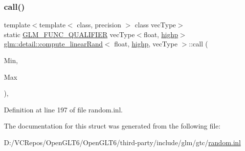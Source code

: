 \subsubsection{\texorpdfstring{call()}{call()}}
{\footnotesize\ttfamily template$<$template$<$ class, precision $>$ class vec\+Type$>$ \\
static \mbox{\hyperlink{setup_8hpp_a33fdea6f91c5f834105f7415e2a64407}{G\+L\+M\+\_\+\+F\+U\+N\+C\+\_\+\+Q\+U\+A\+L\+I\+F\+I\+ER}} vec\+Type$<$float, \mbox{\hyperlink{namespaceglm_a0f04f086094c747d227af4425893f545ac6f7eab42eacbb10d59a58e95e362074}{highp}}$>$ \mbox{\hyperlink{structglm_1_1detail_1_1compute__linear_rand}{glm\+::detail\+::compute\+\_\+linear\+Rand}}$<$ float, \mbox{\hyperlink{namespaceglm_a0f04f086094c747d227af4425893f545ac6f7eab42eacbb10d59a58e95e362074}{highp}}, vec\+Type $>$\+::call (\begin{DoxyParamCaption}\item[{vec\+Type$<$ float, \mbox{\hyperlink{namespaceglm_a0f04f086094c747d227af4425893f545ac6f7eab42eacbb10d59a58e95e362074}{highp}} $>$ const \&}]{Min,  }\item[{vec\+Type$<$ float, \mbox{\hyperlink{namespaceglm_a0f04f086094c747d227af4425893f545ac6f7eab42eacbb10d59a58e95e362074}{highp}} $>$ const \&}]{Max }\end{DoxyParamCaption})\hspace{0.3cm}{\ttfamily [inline]}, {\ttfamily [static]}}



Definition at line 197 of file random.\+inl.



The documentation for this struct was generated from the following file\+:\begin{DoxyCompactItemize}
\item 
D\+:/\+V\+C\+Repos/\+Open\+G\+L\+T6/\+Open\+G\+L\+T6/third-\/party/include/glm/gtc/\mbox{\hyperlink{random_8inl}{random.\+inl}}\end{DoxyCompactItemize}
